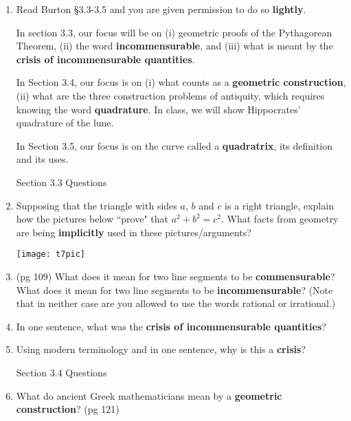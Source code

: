 \documentclass[12pt]{article}
\renewcommand{\emph}[1]{\textsf{\textbf{#1}}}
\begin{document}
\begin{enumerate}
\item Read Burton \S 3.3-3.5 and you are given permission to do so \emph{lightly}. 

In section 3.3, our focus will be on (i) geometric proofs of the Pythagorean Theorem, (ii) the word \emph{incommensurable}, and (iii) what is meant by the \emph{crisis of incommensurable quantities}.

In Section 3.4, our focus is on (i) what counts as a \emph{geometric construction}, (ii) what are the three construction problems of antiquity, which requires knowing the word \emph{quadrature}. In class, we will show Hippocrates' quadrature of the lune.

In Section 3.5, our focus is on the curve called a \emph{quadratrix}, its definition and its uses.

\begin{center} Section 3.3 Questions \end{center}

\item Supposing that the triangle with sides $a$, $b$ and $c$ is a right triangle, explain how the pictures below ``prove" that $a^2+b^2=c^2.$ What facts from geometry are being \emph{implicitly} used in these pictures/arguments?

\texttt{[image: t7pic]}\\
\vfill
\item (pg 109) What does it mean for two line segments to be \emph{commensurable}? What does it mean for two line segments to be \emph{incommensurable}? (Note that in neither case are you allowed to use the words rational or irrational.)\\
\vfill

\item In one sentence, what was the \emph{crisis of incommensurable quantities}? \\
\vfill

\item Using modern terminology and in one sentence, why is this a \emph{crisis}?\\
\vfill

\newpage
\begin{center} Section 3.4 Questions \end{center}

\item What do ancient Greek mathematicians mean by a \emph{geometric construction}? (pg 121)\\
\vfill


\end{enumerate}
\end{document}
